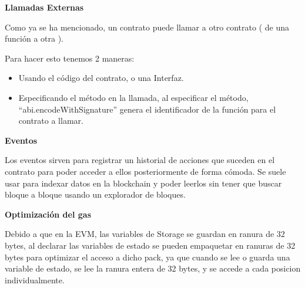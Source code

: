 \bigskip



\newpage

\bigskip

\textbf{Llamadas Externas}

\bigskip

Como ya se ha mencionado, un contrato puede llamar a otro contrato ( de una función a otra ).

Para hacer esto tenemos 2 maneras:

\begin{itemize}
    \item Usando el código del contrato, o una Interfaz.

    

\newpage
    
    \item Especificando el método en la llamada, al especificar el método, “abi.encodeWithSignature” genera el identificador de la función para el contrato a llamar.

    
    
\end{itemize}

\newpage

\bigskip

\textbf{Eventos}

\bigskip

Los eventos sirven para registrar un historial de acciones que suceden en el contrato para poder acceder a ellos posteriormente de forma cómoda. Se suele usar para indexar datos en la blockchain y poder leerlos sin tener que buscar bloque a bloque usando un explorador de bloques\cite{etherscan}.

\bigskip



\bigskip

\textbf{Optimización del gas}

\bigskip

Debido a que en la EVM, las variables de Storage se guardan en ranura de 32 bytes, al declarar las variables de estado se pueden empaquetar en ranuras de 32 bytes para optimizar el acceso a dicho pack, ya que cuando se lee o guarda una variable de estado, se lee la ranura entera de 32 bytes, y se accede a cada posicion individualmente.

